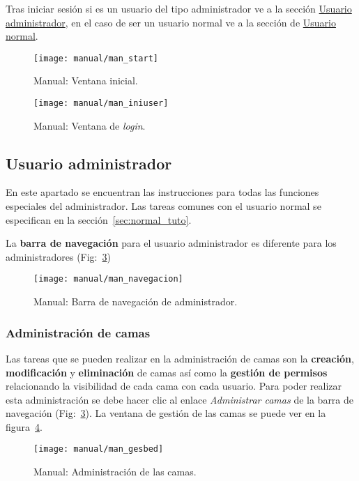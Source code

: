 Tras iniciar sesión si es un usuario del tipo administrador ve a la sección \hyperref[sec:admin_tuto]{Usuario administrador}, en el caso de ser un usuario normal ve a la sección de \hyperref[sec:normal_tuto]{Usuario normal}.

\begin{figure}
	\centering
	\texttt{[image: manual/man\_start]}
	\caption{Manual: Ventana inicial.}
	\label{fig:man_start}
\end{figure}
\begin{figure}
	\centering
	\texttt{[image: manual/man\_iniuser]}
	\caption{Manual: Ventana de \textit{login}.}
	\label{fig:man_inicio}
\end{figure}

\subsection{Usuario administrador}\label{sec:admin_tuto}

En este apartado se encuentran las instrucciones para todas las funciones especiales del administrador. Las tareas comunes con el usuario normal se especifican en la sección~\ref{sec:normal_tuto}.

La \textbf{barra de navegación} para el usuario administrador es diferente para los administradores (Fig:~\ref{fig:man_nav})

\begin{figure}
	\centering
	\texttt{[image: manual/man\_navegacion]}
	\caption{Manual: Barra de navegación de administrador.}
	\label{fig:man_nav}
\end{figure}

\subsubsection{Administración de camas}

Las tareas que se pueden realizar en la administración de camas son la \textbf{creación}, \textbf{modificación} y \textbf{eliminación} de camas así como la \textbf{gestión de permisos} relacionando la visibilidad de cada cama con cada usuario.  Para poder realizar esta administración se debe hacer clic al enlace \textit{Administrar camas} de la barra de navegación (Fig:~\ref{fig:man_nav}). La ventana de gestión de las camas se puede ver en la figura~\ref{fig:man_menu_cama}.

\begin{figure}
	\centering
	\texttt{[image: manual/man\_gesbed]}
	\caption{Manual: Administración de las camas.}
	\label{fig:man_menu_cama}
\end{figure}

